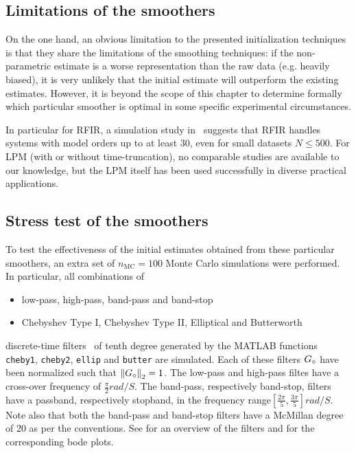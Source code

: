 \subsection{Limitations of the smoothers}
On the one hand, an obvious limitation to the presented initialization techniques is that they share the limitations of the smoothing techniques: if the non-parametric estimate is a worse representation than the raw data (e.g. heavily biased), it is very unlikely that the initial estimate will outperform the existing estimates.
However, it is beyond the scope of this chapter to determine formally which particular smoother is optimal in some specific experimental circumstances.

In particular for RFIR, a simulation study in~\citep{Chen2013} suggests that RFIR handles systems with model orders up to at least $30$, even for small datasets $N\leq 500$.
For LPM (with or without time-truncation), no comparable studies are available to our knowledge, but the LPM itself has been used successfully in diverse practical applications.

\subsection{Stress test of the smoothers}
To test the effectiveness of the initial estimates obtained from these particular smoothers, an extra set of $n_{\mathrm{MC}} = 100$ Monte Carlo simulations were performed.
In particular, all combinations of
\begin{itemize}
  \item low-pass, high-pass, band-pass and band-stop 
  \item Chebyshev Type I, Chebyshev Type II, Elliptical and Butterworth
\end{itemize}
discrete-time filters~\citep{Zverev1967} of tenth degree generated by the MATLAB functions \texttt{cheby1}, \texttt{cheby2}, \texttt{ellip} and \texttt{butter} are simulated.
Each of these filters $\true{G}$ have been normalized such that $\norm[2]{\true{G}} = 1$.
The low-pass and high-pass filtes have a cross-over frequency of $\frac{\pi}{2} \unit{rad/S}$. 
The band-pass, respectively band-stop, filters have a passband, respectively stopband, in the frequency range$\left[ \frac{2\pi}{5}, \frac{3\pi}{5}\right] \unit{rad/S}$.
Note also that both the band-pass and band-stop filters have a McMillan degree of 20 as per the \MATLAB conventions.
See  for an overview of the filters and   for the corresponding bode plots.


